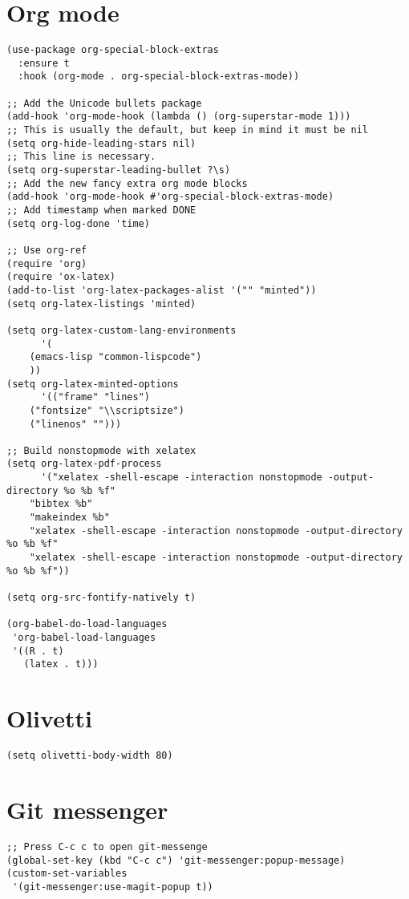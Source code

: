 \documentclass[11pt]{article}
\begin{document}
\section{Org mode}
\label{sec:org0977b00}
\begin{verbatim}
(use-package org-special-block-extras
  :ensure t
  :hook (org-mode . org-special-block-extras-mode))

;; Add the Unicode bullets package
(add-hook 'org-mode-hook (lambda () (org-superstar-mode 1)))
;; This is usually the default, but keep in mind it must be nil
(setq org-hide-leading-stars nil)
;; This line is necessary.
(setq org-superstar-leading-bullet ?\s)
;; Add the new fancy extra org mode blocks
(add-hook 'org-mode-hook #'org-special-block-extras-mode)
;; Add timestamp when marked DONE
(setq org-log-done 'time)

;; Use org-ref
(require 'org)
(require 'ox-latex)
(add-to-list 'org-latex-packages-alist '("" "minted"))
(setq org-latex-listings 'minted)

(setq org-latex-custom-lang-environments
      '(
	(emacs-lisp "common-lispcode")
	))
(setq org-latex-minted-options
      '(("frame" "lines")
	("fontsize" "\\scriptsize")
	("linenos" "")))

;; Build nonstopmode with xelatex
(setq org-latex-pdf-process
      '("xelatex -shell-escape -interaction nonstopmode -output-directory %o %b %f"
	"bibtex %b"
	"makeindex %b"
	"xelatex -shell-escape -interaction nonstopmode -output-directory %o %b %f"
	"xelatex -shell-escape -interaction nonstopmode -output-directory %o %b %f"))

(setq org-src-fontify-natively t)

(org-babel-do-load-languages
 'org-babel-load-languages
 '((R . t)
   (latex . t)))
\end{verbatim}
\section{Olivetti}
\label{sec:orgdf3a3ea}
\begin{verbatim}
(setq olivetti-body-width 80)
\end{verbatim}
\section{Git messenger}
\label{sec:org39bba6c}
\begin{verbatim}
;; Press C-c c to open git-messenge
(global-set-key (kbd "C-c c") 'git-messenger:popup-message)
(custom-set-variables
 '(git-messenger:use-magit-popup t))
\end{verbatim}
\end{document}
